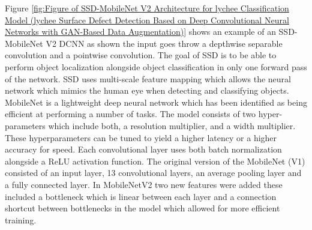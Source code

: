 Figure \ref{fig:Figure of SSD-MobileNet V2 Architecture for lychee Classification Model (lychee Surface Defect Detection Based on Deep Convolutional Neural Networks with GAN-Based Data Augmentation)} shows an example of an SSD-MobileNet V2 DCNN as shown the input goes throw a depthwise separable convolution and a pointwise convolution.  The goal of SSD is to be able to perform object localization alongside object classification in only one forward pass of the network.  SSD uses multi-scale feature mapping which allows the neural network which mimics the human eye when detecting and classifying objects.  MobileNet is a lightweight deep neural network which has been identified as being efficient at performing a number of tasks.  The model consists of two hyper-parameters which include both, a  resolution multiplier, and a width multiplier. These hyperparameters can be tuned to yield a higher latency or a higher accuracy for speed.  Each convolutional layer uses both batch normalization alongside a ReLU activation function.  The original version of the MobileNet (V1) consisted of an input layer, 13 convolutional layers, an average pooling layer and a fully connected layer\cite{litReviewLychee}.  In MobileNetV2 two new features were added these included a bottleneck which is linear between each layer and a connection shortcut between bottlenecks in the model which allowed for more efficient training.  
